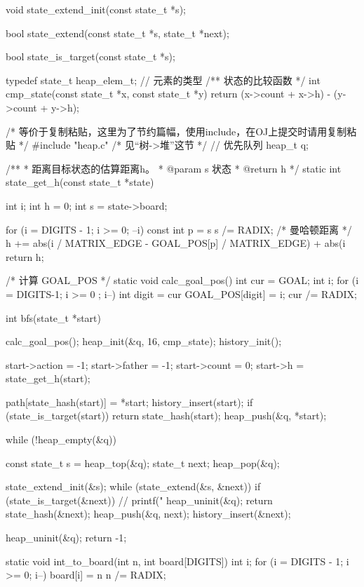 \begin{Codex}[label=eight_digits_astar.c]
void state_extend_init(const state_t *s);

bool state_extend(const state_t *s, state_t *next);

bool state_is_target(const state_t *s);

typedef state_t heap_elem_t; // 元素的类型
/** 状态的比较函数 */
int cmp_state(const state_t *x, const state_t *y) {
    return (x->count + x->h) - (y->count + y->h);
}

/* 等价于复制粘贴，这里为了节约篇幅，使用include，在OJ上提交时请用复制粘贴 */
#include "heap.c"  /* 见“树->堆”这节 */
// 优先队列
heap_t q;

/**
 * 距离目标状态的估算距离h。
 * @param s 状态
 * @return h
 */
static int state_get_h(const state_t *state) {
    int i;
    int h = 0;
    int s = state->board;

    for (i = DIGITS - 1; i >= 0; --i) {
        const int p = s %
        s /= RADIX;
        /* 曼哈顿距离 */
        h += abs(i / MATRIX_EDGE - GOAL_POS[p] / MATRIX_EDGE) +
            abs(i %
    }
    return h;
}

/* 计算 GOAL_POS */
static void calc_goal_pos() {
    int cur = GOAL;
    int i;
    for (i = DIGITS-1; i >= 0 ; i--) {
        int digit = cur %
        GOAL_POS[digit] = i;
        cur /= RADIX;
    }
}

int bfs(state_t *start) {
    calc_goal_pos();
    heap_init(&q, 16, cmp_state);
    history_init();

    start->action = -1;
    start->father = -1;
    start->count = 0;
    start->h = state_get_h(start);

    path[state_hash(start)] = *start;
    history_insert(start);
    if (state_is_target(start))
        return state_hash(start);
    heap_push(&q, *start);

    while (!heap_empty(&q)) {
        const state_t s = heap_top(&q);
        state_t next;
        heap_pop(&q);

        state_extend_init(&s);
        while (state_extend(&s, &next)) {
            if (state_is_target(&next)) {
                // printf("%
                heap_uninit(&q);
                return state_hash(&next);
            }
            heap_push(&q, next);
            history_insert(&next);
        }
    }
    heap_uninit(&q);
    return -1;
}

static void int_to_board(int n, int board[DIGITS]) {
    int i;
    for (i = DIGITS - 1; i >= 0; i--) {
        board[i] = n %
        n /= RADIX;
    }
}


\end{Codex}
